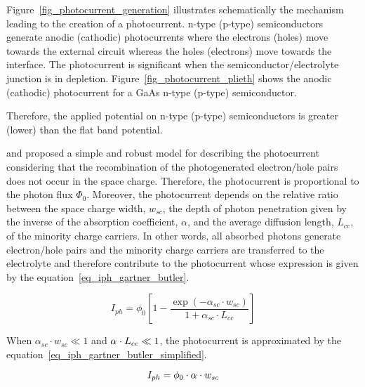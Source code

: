     Figure~\ref{fig_photocurrent_generation} illustrates schematically the 
    mechanism leading to the creation of a photocurrent. n-type (p-type) 
    semiconductors generate anodic (cathodic) photocurrents where the 
    electrons (holes) move towards the external circuit whereas the holes (electrons) 
    move towards the interface. 
    The photocurrent is significant when the semiconductor/electrolyte junction 
    is in depletion. 
    Figure~\ref{fig_photocurrent_plieth} shows the anodic (cathodic) photocurrent 
    for a GaAs n-type (p-type) semiconductor.

    Therefore, the applied potential on n-type (p-type) semiconductors is 
    greater (lower) than the flat band potential. 

    

    

    \citet{gartner1959} and \citet{butler1977}  
    proposed a simple and robust model for 
    describing the photocurrent considering that the recombination of the 
    photogenerated electron/hole pairs does not occur in the space charge. 
    Therefore, the photocurrent is proportional to the photon flux $\Phi _0$. 
    Moreover, the photocurrent depends on the relative ratio between the space 
    charge width, $w_{sc}$, the depth of photon penetration given by the inverse 
    of the absorption coefficient, $ \alpha $, and the average diffusion length, 
    $L_{cc}$, of the minority charge carriers. 
    In other words, all absorbed photons generate electron/hole pairs and 
    the minority charge carriers are transferred to the electrolyte and 
    therefore contribute to the photocurrent whose expression is given 
    by the equation~\ref{eq_iph_gartner_butler}.

    \begin{equation}
        I_{ph} = \phi _0 \left[ 1 - \frac{\exp (-\alpha _{sc} \cdot w_{sc})}{1+\alpha _{sc} \cdot
        L_{cc}} \right]
        \label{eq_iph_gartner_butler}
    \end{equation}

    When $\alpha _{sc} \cdot w_{sc} \ll 1$ and $\alpha _{\sc} \cdot L_{cc} \ll 1$, 
    the photocurrent is approximated by the 
    equation~\ref{eq_iph_gartner_butler_simplified}.

    \begin{equation}
        I_{ph} = \phi _0 \cdot \alpha _{\sc} \cdot w_{sc}
        \label{eq_iph_gartner_butler_simplified}
    \end{equation}

